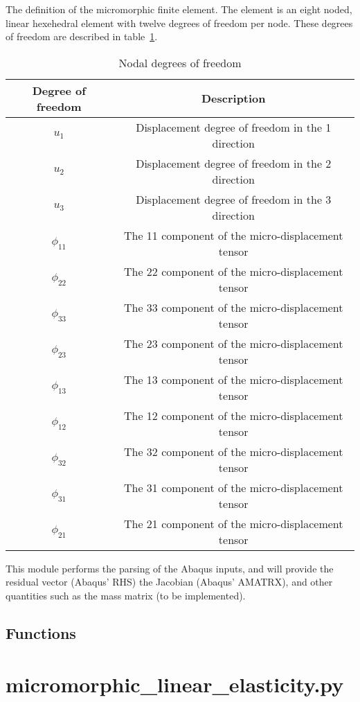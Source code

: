 \documentclass{asme2ej}
\begin{document}
The definition of the micromorphic finite element. The element is an eight noded, linear hexehedral element with twelve degrees of freedom per node. These degrees of freedom are described in table~\ref{table:nodal_dof}.

\begin{table}
\centering
\begin{tabular}{c c}
\hline
Degree of freedom & Description \\
\hline
\hline
$u_1$ & Displacement degree of freedom in the 1 direction\\
$u_2$ & Displacement degree of freedom in the 2 direction\\
$u_3$ & Displacement degree of freedom in the 3 direction\\
$\phi_{11}$ & The 11 component of the micro-displacement tensor\\
$\phi_{22}$ & The 22 component of the micro-displacement tensor\\
$\phi_{33}$ & The 33 component of the micro-displacement tensor\\
$\phi_{23}$ & The 23 component of the micro-displacement tensor\\
$\phi_{13}$ & The 13 component of the micro-displacement tensor\\
$\phi_{12}$ & The 12 component of the micro-displacement tensor\\
$\phi_{32}$ & The 32 component of the micro-displacement tensor\\
$\phi_{31}$ & The 31 component of the micro-displacement tensor\\
$\phi_{21}$ & The 21 component of the micro-displacement tensor\\
\hline
\end{tabular}
\caption{Nodal degrees of freedom}
\label{table:nodal_dof}
\end{table}

This module performs the parsing of the Abaqus inputs, and will provide the residual vector (Abaqus' RHS) the Jacobian (Abaqus' AMATRX), and other quantities such as the mass matrix (to be implemented).

\subsection{Functions}

\section{micromorphic\_linear\_elasticity.py}
\end{document}
